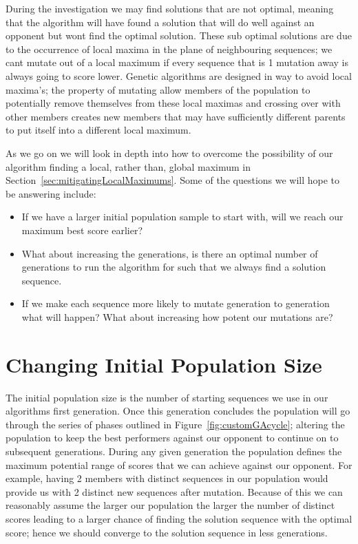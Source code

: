 During the investigation we may find solutions that are not optimal, meaning that the algorithm will have found a solution that will do well against an opponent but wont find the optimal solution.
These sub optimal solutions are due to the occurrence of local maxima in the plane of neighbouring sequences; we cant mutate out of a local maximum if every sequence that is 1 mutation away is always going to score lower.
Genetic algorithms are designed in way to avoid local maxima's;
the property of mutating allow members of the population to potentially remove themselves from these local maximas and crossing over with other members creates new members that may have sufficiently different parents to put itself into a different local maximum.

As we go on we will look in depth into how to overcome the possibility of our algorithm finding a local, rather than, global maximum in Section~\ref{sec:mitigatingLocalMaximums}.
Some of the questions we will hope to be answering include:
\begin{itemize}
    \item If we have a larger initial population sample to start with, will we reach our maximum best score earlier?
    \item What about increasing the generations, is there an optimal number of generations to run the algorithm for such that we always find a solution sequence.
    \item If we make each sequence more likely to mutate generation to generation what will happen?
    What about increasing how potent our mutations are?
\end{itemize}

\section{Changing Initial Population Size}\label{sec:ChangingInitialPopulationSize}
The initial population size is the number of starting sequences we use in our algorithms first generation.
Once this generation concludes the population will go through the series of phases outlined in Figure~\ref{fig:customGAcycle}; altering the population to keep the best performers against our opponent to continue on to subsequent generations.
During any given generation the population defines the maximum potential range of scores that we can achieve against our opponent.
For example, having 2 members with distinct sequences in our population would provide us with 2 distinct new sequences after mutation.
Because of this we can reasonably assume the larger our population the larger the number of distinct scores leading to a larger chance of finding the solution sequence with the optimal score;
hence we should converge to the solution sequence in less generations.

